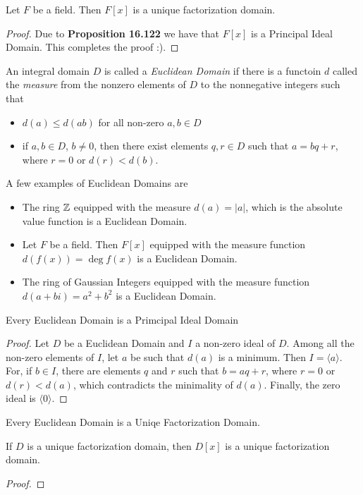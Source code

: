 \begin{corollary}
	Let $F$ be a field. Then $F[x]$ is a unique factorization domain.
\end{corollary}
\begin{proof}
	Due to \textbf{Proposition 16.122} we have that $F[x]$ is a Principal Ideal Domain. This completes the proof :).
\end{proof}

\begin{definition}
	An integral domain $D$ is called a \textit{Euclidean Domain} if there is a functoin $d$ called the \textit{measure} from the nonzero elements of $D$ to the nonnegative integers such that 
	\begin{itemize}
		\item $d(a)\le d(ab)$ for all non-zero $a,b\in D$
		\item if $a,b\in D$, $b\ne0$, then there exist elements $q,r\in D$ such that $a=bq+r$, where $r=0$ or $d(r)<d(b)$.
	\end{itemize}
\end{definition}
A few examples of Euclidean Domains are
\begin{itemize}
	\item The ring $\mathbb{Z}$ equipped with the measure $d(a)=|a|$, which is the absolute value function is a Euclidean Domain.
	\item Let $F$ be a field. Then $F[x]$ equipped with the measure function $d(f(x)) = \deg f(x)$ is a Euclidean Domain.
	\item The ring of Gaussian Integers equipped with the measure function $d(a+bi) = a^2+b^2$ is a Euclidean Domain.
\end{itemize}

\begin{proposition}
	Every Euclidean Domain is a Primcipal Ideal Domain
\end{proposition}
\begin{proof}
	Let $D$ be a Euclidean Domain and $I$ a non-zero ideal of $D$. Among all the non-zero elements of $I$, let $a$ be such that $d(a)$ is a minimum. Then $I=\langle a\rangle$. For, if $b\in I$, there are elements $q$ and $r$ such that $b=aq+r$, where $r=0$ or $d(r)<d(a)$, which contradicts the minimality of $d(a)$. Finally, the zero ideal is $\langle 0\rangle$.
\end{proof}
\begin{corollary}
	Every Euclidean Domain is a Uniqe Factorization Domain.
\end{corollary}

\begin{proposition}
	If $D$ is a unique factorization domain, then $D[x]$ is a unique factorization domain.
\end{proposition}
\begin{proof}
\end{proof}